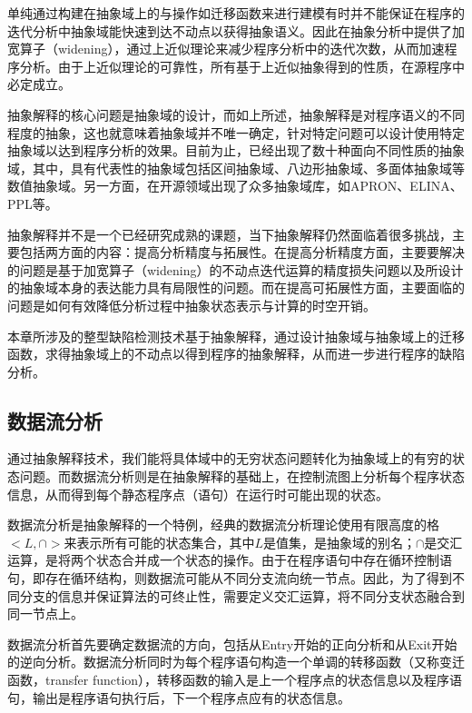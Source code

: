  单纯通过构建在抽象域上的与操作如迁移函数来进行建模有时并不能保证在程序的迭代分析中抽象域能快速到达不动点以获得抽象语义。因此在抽象分析中提供了加宽算子（widening），通过上近似理论来减少程序分析中的迭代次数，从而加速程序分析。由于上近似理论的可靠性，所有基于上近似抽象得到的性质，在源程序中必定成立。
 
 抽象解释的核心问题是抽象域的设计，而如上所述，抽象解释是对程序语义的不同程度的抽象，这也就意味着抽象域并不唯一确定，针对特定问题可以设计使用特定抽象域以达到程序分析的效果。目前为止，已经出现了数十种面向不同性质的抽象域，其中，具有代表性的抽象域包括区间抽象域、八边形抽象域、多面体抽象域等数值抽象域\cite{张健2019程序分析研究进展}。另一方面，在开源领域出现了众多抽象域库，如APRON\cite{jeannet2009apron}、ELINA\cite{singh2017practical}、PPL\cite{bagnara2006parma}等。
 
 抽象解释并不是一个已经研究成熟的课题，当下抽象解释仍然面临着很多挑战，主要包括两方面的内容：提高分析精度与拓展性。在提高分析精度方面，主要要解决的问题是基于加宽算子（widening）的不动点迭代运算的精度损失问题以及所设计的抽象域本身的表达能力具有局限性的问题。而在提高可拓展性方面，主要面临的问题是如何有效降低分析过程中抽象状态表示与计算的时空开销。
 
 本章所涉及的整型缺陷检测技术基于抽象解释，通过设计抽象域与抽象域上的迁移函数，求得抽象域上的不动点以得到程序的抽象解释，从而进一步进行程序的缺陷分析。
 
 \subsection{数据流分析}
 
 通过抽象解释技术，我们能将具体域中的无穷状态问题转化为抽象域上的有穷的状态问题。而数据流分析则是在抽象解释的基础上，在控制流图上分析每个程序状态信息，从而得到每个静态程序点（语句）在运行时可能出现的状态。
 
 数据流分析是抽象解释的一个特例，经典的数据流分析理论\cite{aho1986compilers}使用有限高度的格$ <L,∩> $来表示所有可能的状态集合，其中$ L $是值集，是抽象域的别名；$ ∩ $是交汇运算，是将两个状态合并成一个状态的操作。由于在程序语句中存在循环控制语句，即存在循环结构，则数据流可能从不同分支流向统一节点。因此，为了得到不同分支的信息并保证算法的可终止性，需要定义交汇运算，将不同分支状态融合到同一节点上。
 
 数据流分析首先要确定数据流的方向，包括从Entry开始的正向分析和从Exit开始的逆向分析。数据流分析同时为每个程序语句构造一个单调的转移函数（又称变迁函数，transfer function），转移函数的输入是上一个程序点的状态信息以及程序语句，输出是程序语句执行后，下一个程序点应有的状态信息。
 
